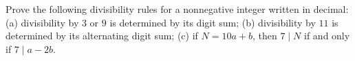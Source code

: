 Prove the following divisibility rules for a nonnegative integer written in decimal: (a) divisibility by $3$ or $9$ is determined by its digit sum; (b) divisibility by $11$ is determined by its alternating digit sum; (c) if $N=10a+b$, then $7\mid N$ if and only if $7\mid a-2b$.
